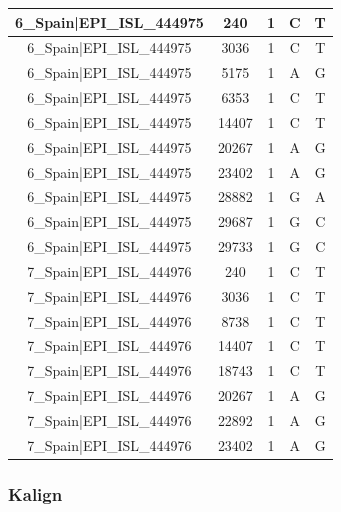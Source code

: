 \documentclass[a4paper,10pt]{article}
\begin{document}
\begin{longtable}{@{}ccccc@{}}
6\_Spain|EPI\_ISL\_444975 & 240 & 1 & C & T \\* \midrule
6\_Spain|EPI\_ISL\_444975 & 3036 & 1 & C & T \\* \midrule
6\_Spain|EPI\_ISL\_444975 & 5175 & 1 & A & G \\* \midrule
6\_Spain|EPI\_ISL\_444975 & 6353 & 1 & C & T \\* \midrule
6\_Spain|EPI\_ISL\_444975 & 14407 & 1 & C & T \\* \midrule
6\_Spain|EPI\_ISL\_444975 & 20267 & 1 & A & G \\* \midrule
6\_Spain|EPI\_ISL\_444975 & 23402 & 1 & A & G \\* \midrule
6\_Spain|EPI\_ISL\_444975 & 28882 & 1 & G & A \\* \midrule
6\_Spain|EPI\_ISL\_444975 & 29687 & 1 & G & C \\* \midrule
6\_Spain|EPI\_ISL\_444975 & 29733 & 1 & G & C \\* \midrule
7\_Spain|EPI\_ISL\_444976 & 240 & 1 & C & T \\* \midrule
7\_Spain|EPI\_ISL\_444976 & 3036 & 1 & C & T \\* \midrule
7\_Spain|EPI\_ISL\_444976 & 8738 & 1 & C & T \\* \midrule
7\_Spain|EPI\_ISL\_444976 & 14407 & 1 & C & T \\* \midrule
7\_Spain|EPI\_ISL\_444976 & 18743 & 1 & C & T \\* \midrule
7\_Spain|EPI\_ISL\_444976 & 20267 & 1 & A & G \\* \midrule
7\_Spain|EPI\_ISL\_444976 & 22892 & 1 & A & G \\* \midrule
7\_Spain|EPI\_ISL\_444976 & 23402 & 1 & A & G \\* \bottomrule
\end{longtable}

\newpage
\subsubsection{Kalign}
\end{document}
